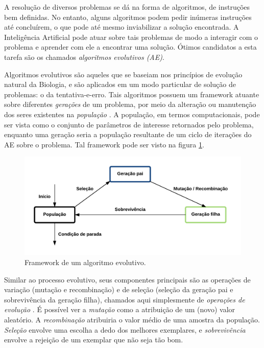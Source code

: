 \label{introducao}

A resolução de diversos problemas se dá na forma de algoritmos, de instruções bem definidas. No entanto, alguns algoritmos podem pedir inúmeras instruções até concluírem, o que pode até mesmo inviabilizar a solução encontrada. A Inteligência Artificial pode atuar sobre tais problemas de modo a interagir com o problema e aprender com ele a encontrar uma solução. Ótimos candidatos a esta tarefa são os chamados \emph{algoritmos evolutivos (AE)}.

Algoritmos evolutivos são aqueles que se baseiam nos princípios de evolução natural da Biologia, e são aplicados em um modo particular de solução de problemas: o da tentativa-e-erro. Tais algoritmos possuem um framework atuante sobre diferentes \emph{gerações} de um problema, por meio da alteração ou manutenção dos seres existentes na \emph{população} \cite{eiben2003introduction}. A população, em termos computacionais, pode ser vista como o conjunto de parâmetros de interesse retornados pelo problema, enquanto uma geração seria a população resultante de um ciclo de iterações do AE sobre o problema. Tal framework pode ser visto na figura \ref{fig:evolution-framework}.

\begin{figure}[ht!]
    \centering	\includegraphics[width=1.0\textwidth]{evolution-framework.png}
    \caption{Framework de um algoritmo evolutivo.}
    \label{fig:evolution-framework}
\end{figure}

Similar ao processo evolutivo, seus componentes principais são as operações de variação (mutação e recombinação) e de seleção (seleção da geração pai e sobrevivência da geração filha), chamados aqui simplesmente de \emph{operações de evolução} \cite{eiben2011parameter}. É possível ver a \emph{mutação} como a atribuição de um (novo) valor aleatório. A \emph{recombinação} atribuiria o valor médio de uma amostra da população. \emph{Seleção} envolve uma escolha a dedo dos melhores exemplares, e \emph{sobrevivência} envolve a rejeição de um exemplar que não seja tão bom.

